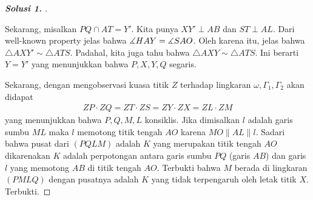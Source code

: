 \documentclass[letterpaper, 13pt]{scrartcl}
\begin{document}
\begin{proof}[\textbf{Solusi 1. }]
\begin{center}
\begin{tikzpicture}[scale=3, dot/.style={circle, fill, inner sep=0.5pt, outer sep=0pt}]
    \end{tikzpicture}
\end{center}

Sekarang, misalkan $PQ \cap AT = Y'$. Kita punya $XY' \perp AB$ dan $ST \perp AL$. Dari well-known property jelas bahwa $\measuredangle HAY = \measuredangle SAO$. Oleh karena itu, jelas bahwa $\triangle AXY' \sim \triangle ATS$. Padahal, kita juga tahu bahwa $\triangle AXY \sim \triangle ATS$. Ini berarti $Y=Y'$ yang menunjukkan bahwa $P,X,Y,Q$ segaris.

Sekarang, dengan mengobservasi kuasa titik $Z$ terhadap lingkaran $\omega, \Gamma_1, \Gamma_2$ akan didapat
\begin{align*}
    ZP \cdot ZQ = ZT \cdot ZS = ZY \cdot ZX = ZL \cdot ZM
\end{align*}
yang menunjukkan bahwa $P,Q,M,L$ konsiklis. Jika dimisalkan $l$ adalah garis sumbu $ML$ maka $l$ memotong titik tengah $AO$ karena $MO \parallel AL \parallel l$. Sadari bahwa pusat dari $(PQLM)$ adalah $K$ yang merupakan titik tengah $AO$ dikarenakan $K$ adalah perpotongan antara garis sumbu $PQ$ (garis $AB$) dan garis $l$ yang memotong $AB$ di titik tengah $AO$. Terbukti bahwa $M$ berada di lingkaran $(PMLQ)$ dengan pusatnya adalah $K$ yang tidak terpengaruh oleh letak titik $X$. Terbukti.
\end{proof}
\end{document}
